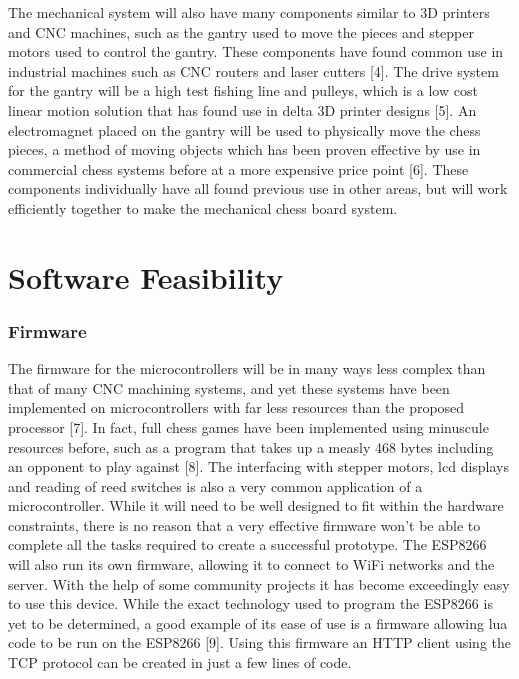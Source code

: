 \documentclass{article}
\begin{document}
The mechanical system will also have many components similar to 3D printers and CNC machines, such as the gantry used to move the pieces and stepper motors used to control the gantry. These components have found common use in industrial machines such as CNC routers and laser cutters [4]. The drive system for the gantry will be a high test fishing line and pulleys, which is a low cost linear motion solution that has found use in delta 3D printer designs [5]. An electromagnet placed on the gantry will be used to physically move the chess pieces, a method of moving objects which has been proven effective by use in commercial chess systems before at a more expensive price point [6]. These components individually have all found previous use in other areas, but will work efficiently together to make the mechanical chess board system.


\section*{Software Feasibility}

\subsubsection*{Firmware}
\indent

The firmware for the microcontrollers will be in many ways less complex than that of many CNC machining systems, and yet these systems have been implemented on microcontrollers with far less resources than the proposed processor [7]. In fact, full chess games have been implemented using minuscule resources before, such as a program that takes up a measly 468 bytes including an opponent to play against [8]. The interfacing with stepper motors, lcd displays and reading of reed switches is also a very common application of a microcontroller. While it will need to be well designed to fit within the hardware constraints, there is no reason that a very effective firmware won't be able to complete all the tasks required to create a successful prototype. The ESP8266 will also run its own firmware, allowing it to connect to WiFi networks and the server. With the help of some community projects it has become exceedingly easy to use this device. While the exact technology used to program the ESP8266 is yet to be determined, a good example of its ease of use is a firmware allowing lua code to be run on the ESP8266 [9]. Using this firmware an HTTP client using the TCP protocol can be created in just a few lines of code.
\end{document}
